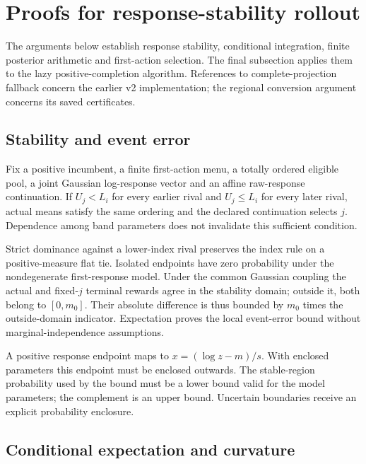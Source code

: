 \section{Proofs for response-stability rollout}\label{sec:supp_positive_proofs}

The arguments below establish response stability, conditional integration, finite posterior arithmetic and first-action selection. The final subsection applies them to the lazy positive-completion algorithm. References to complete-projection fallback concern the earlier v2 implementation; the regional conversion argument concerns its saved certificates.

\subsection{Stability and event error}

Fix a positive incumbent, a finite first-action menu, a totally ordered eligible pool, a joint Gaussian log-response vector and an affine raw-response continuation. If $U_j<L_i$ for every earlier rival and $U_j\le L_i$ for every later rival, actual means satisfy the same ordering and the declared continuation selects $j$. Dependence among band parameters does not invalidate this sufficient condition.

Strict dominance against a lower-index rival preserves the index rule on a positive-measure flat tie. Isolated endpoints have zero probability under the nondegenerate first-response model. Under the common Gaussian coupling the actual and fixed-$j$ terminal rewards agree in the stability domain; outside it, both belong to $[0,m_0]$. Their absolute difference is thus bounded by $m_0$ times the outside-domain indicator. Expectation proves the local event-error bound without marginal-independence assumptions.

A positive response endpoint maps to $x=(\log z-m)/s$. With enclosed parameters this endpoint must be enclosed outwards. The stable-region probability used by the bound must be a lower bound valid for the model parameters; the complement is an upper bound. Uncertain boundaries receive an explicit probability enclosure.



\subsection{Conditional expectation and curvature}

